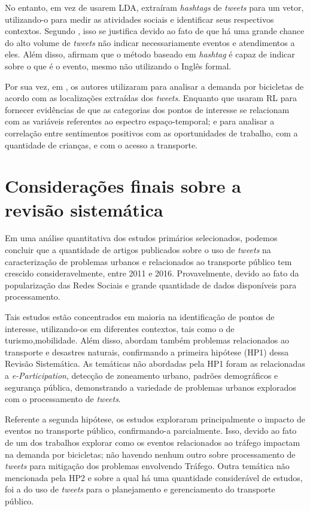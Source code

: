 \documentclass[
	12pt,				%
	oneside,			%
	a4paper,			%
	english,			%
	brazil				%
	]{abntex2ppgsi}
\begin{document}
{{No entanto, \cite{Ni2016} em vez de usarem LDA, extraíram \textit{hashtags} de \textit{tweets} para um vetor, utilizando-o para medir as atividades sociais e identificar seus respectivos contextos. Segundo \cite{Ni2016}, isso se justifica devido ao fato de que há uma grande chance do alto volume de \textit{tweets} não indicar necessariamente eventos e atendimentos a eles. Além disso, afirmam que o método baseado em \textit{hashtag} é capaz de indicar sobre o que é o evento, mesmo não utilizando o Inglês formal.

Por sua vez, em \cite{Gutev2016}, os autores utilizaram  para analisar a demanda por bicicletas de acordo com as localizações extraídas dos \textit{tweets}. Enquanto que \cite{Bendler2014} usaram RL para fornecer evidências de que as categorias dos pontos de interesse se relacionam com as variáveis referentes ao espectro espaço-temporal; e \cite{Guo2016} para analisar a correlação entre sentimentos positivos com as oportunidades de trabalho, com a quantidade de crianças, e com o acesso a transporte. 

\section{Considerações finais sobre a revisão sistemática}
\label{conclusao}
Em uma análise quantitativa dos estudos primários selecionados, podemos concluir que a quantidade de artigos publicados sobre o uso de \textit{tweets} na caracterização de problemas urbanos e relacionados ao transporte público tem crescido consideravelmente, entre 2011 e 2016. Provavelmente, devido ao fato da popularização das Redes Sociais e grande quantidade de dados disponíveis para processamento.

Tais estudos estão concentrados em maioria na identificação de pontos de interesse, utilizando-os em diferentes contextos, tais como o de turismo,mobilidade. Além disso, abordam também problemas relacionados ao transporte e desastres naturais, confirmando a primeira hipótese (HP1) dessa Revisão Sistemática. As temáticas não abordadas pela HP1 foram as relacionadas a \textit{e-Participation}, detecção de zoneamento urbano, padrões demográficos e segurança pública, demonstrando a variedade de problemas urbanos explorados com o processamento de \textit{tweets}.

Referente a segunda hipótese, os estudos exploraram principalmente o impacto de eventos no transporte público, confirmando-a parcialmente. Isso, devido ao fato de um dos trabalhos explorar como os eventos relacionados ao tráfego impactam na demanda por bicicletas; não havendo nenhum outro sobre processamento de \textit{tweets} para mitigação dos problemas envolvendo Tráfego. Outra temática não mencionada pela HP2 e sobre a qual há uma quantidade considerável de estudos, foi a do uso de \textit{tweets} para o planejamento e gerenciamento do transporte público.

}}
\end{document}
